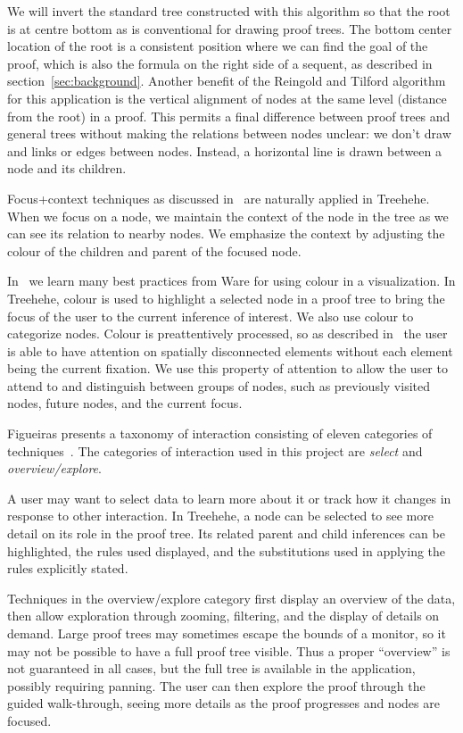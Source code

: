 \documentclass[journal]{vgtc}                %
\newcommand{\projectname}{Treehehe}
\begin{document}
We will invert the standard tree constructed with this algorithm so that the root is at centre bottom as is conventional for drawing proof trees. The bottom center location of the root is a consistent position where we can find the goal of the proof, which is also the formula on the right side of a sequent, as described in section~\ref{sec:background}. Another benefit of the Reingold and Tilford algorithm for this application is the vertical alignment of nodes at the same level (distance from the root) in a proof. This permits a final difference between proof trees and general trees without making the relations between nodes unclear: we don't draw and links or edges between nodes. Instead, a horizontal line is drawn between a node and its children.

Focus+context techniques as discussed in~\cite{graphvis-herman+melancon+marshall} are naturally applied in \projectname{}. When we focus on a node, we maintain the context of the node in the tree as we can see its relation to nearby nodes. We emphasize the context by adjusting the colour of the children and parent of the focused node.

In~\cite[Chapter 3]{infovis-ware} we learn many best practices from Ware for using colour in a visualization. In \projectname{}, colour is used to highlight a selected node in a proof tree to bring the focus of the user to the current inference of interest. We also use colour to categorize nodes. Colour is preattentively processed, so as described in~\cite[Chapter 11]{infovis-ware} the user is able to have attention on spatially disconnected elements without each element being the current fixation. We use this property of attention to allow the user to attend to and distinguish between groups of nodes, such as previously visited nodes, future nodes, and the current focus.

Figueiras presents a taxonomy of interaction consisting of eleven categories of techniques~\cite{interaction-figueiras}. The categories of interaction used in this project are \textit{select} and \textit{overview/explore}.

A user may want to select data to learn more about it or track how it changes in response to other interaction. In \projectname{}, a node can be selected to see more detail on its role in the proof tree. Its related parent and child inferences can be highlighted, the rules used displayed, and the substitutions used in applying the rules explicitly stated.

Techniques in the overview/explore category first display an overview of the data, then allow exploration through zooming, filtering, and the display of details on demand. Large proof trees may sometimes escape the bounds of a monitor, so it may not be possible to have a full proof tree visible. Thus a proper ``overview'' is not guaranteed in all cases, but the full tree is available in the application, possibly requiring panning. The user can then explore the proof through the guided walk-through, seeing more details as the proof progresses and nodes are focused.
\end{document}

